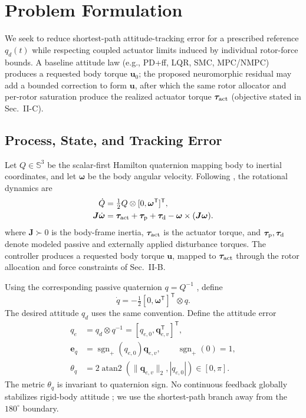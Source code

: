 \documentclass[letterpaper, 10 pt, conference]{ieeeconf}
\newcommand{\T}{^{\mathsf T}}
\newcommand{\sgnp}{\operatorname{sgn}_{+}}
\begin{document}
\section{Problem Formulation}
\label{sec:problem}
We seek to reduce shortest-path attitude-tracking error for a prescribed reference $q_d(t)$ while respecting coupled actuator limits induced by individual rotor-force bounds. A baseline attitude law (e.g., PD+ff, LQR, SMC, MPC/NMPC) produces a requested body torque $\bm u_0$; the proposed neuromorphic residual may add a bounded correction to form $\bm u$, after which the same rotor allocator and per-rotor saturation produce the realized actuator torque $\bm\tau_{\rm act}$ (objective stated in Sec.~II-C).

\subsection{Process, State, and Tracking Error}

Let $Q\in\mathbb S^3$ be the scalar-first Hamilton quaternion mapping body to
inertial coordinates, and let $\bm\omega$ be the body angular velocity. Following \cite{schaub2018amss}, the
rotational dynamics are 
\begin{align}
 \dot Q&=\tfrac12 Q\otimes[0,\bm\omega\T]\T,\\
 \bm J\dot{\bm\omega}&=\bm\tau_{\rm act}+\bm\tau_{\rm p}
       +\bm\tau_{\rm d}-\bm\omega\times(\bm J\bm\omega).
 \label{eq:plant}
\end{align}
where $\bm J\succ0$ is the body-frame inertia, $\bm\tau_{\rm act}$ is the actuator torque, and $\bm\tau_{\rm p},\bm\tau_{\rm d}$ denote modeled passive and externally applied disturbance torques. The controller produces a requested body torque $\bm u$, mapped to $\bm\tau_{\rm act}$ through the rotor allocation and force constraints of Sec.~II-B.

Using the corresponding passive quaternion $q=Q^{-1}$ \cite{diebel2006quaternion}, define
\begin{equation}
 \dot q=-\tfrac12[0,\bm\omega\T]\T\otimes q.
 \label{eq:passive}
\end{equation}
The desired attitude $q_d$ uses the same convention. Define the attitude error
\begin{align}
 q_e&=q_d\otimes q^{-1}=[q_{e,0},\bm q_{e,v}\T]\T,\\
 \bm e_q&=\sgnp(q_{e,0})\bm q_{e,v},\qquad \sgnp(0)=1,\\
 \theta_q&=2\operatorname{atan2}(\|\bm q_{e,v}\|_2,|q_{e,0}|)
             \in[0,\pi].
 \label{eq:theta}
\end{align}
The metric $\theta_q$ is invariant to quaternion sign. No continuous feedback globally stabilizes rigid-body attitude \cite{chaturvedi2011rigid}; we use the shortest-path branch away from the $180^\circ$ boundary.
\end{document}
